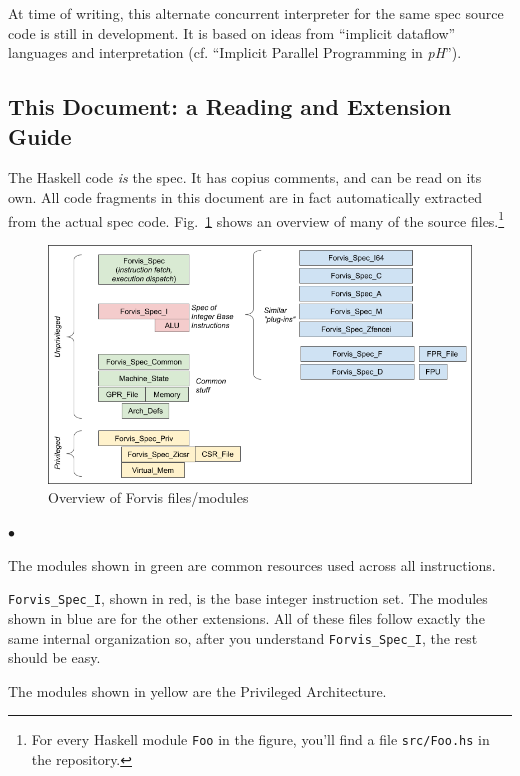 \documentclass[11pt]{article}
\newenvironment{tightlist}%
{\begin{list}{$\bullet$}{%
    \setlength{\topsep}{0in}
    \setlength{\partopsep}{0in}
    \setlength{\itemsep}{0in}
    \setlength{\parsep}{0in}
    \setlength{\leftmargin}{1.5em}
    \setlength{\rightmargin}{0in}
    \setlength{\itemindent}{0in}
}
}%
{\end{list}
}
\begin{document}
At time of writing, this alternate concurrent interpreter for the same
spec source code is still in development.  It is based on ideas from
``implicit dataflow'' languages and interpretation (cf.  ``Implicit
Parallel Programming in \emph{pH}''\cite{Nikhil2000a}).


\subsection{This Document: a Reading and Extension Guide}

The Haskell code \emph{is} the spec.  It has copius comments, and can
be read on its own.  All code fragments in this document are in fact
automatically extracted from the actual spec code.
Fig.~\ref{Fig_Overview} shows an overview of many of the source
files.\footnote{For every Haskell module {\tt Foo} in the figure,
you'll find a file {\tt src/Foo.hs} in the repository.}

\begin{figure}[htbp]
    \centering
    \includegraphics[width=6in]{Figs/Fig_Overview}
    \caption{\label{Fig_Overview}
                    Overview of Forvis files/modules}
\end{figure}

\begin{tightlist}

\item The modules shown in green are common resources used across all instructions.

\item \verb|Forvis_Spec_I|, shown in red, is the base integer
instruction set.  The modules shown in blue are for the other
extensions. All of these files follow exactly the same internal
organization so, after you understand \verb|Forvis_Spec_I|, the rest
should be easy.

\item The modules shown in yellow are the Privileged Architecture.

\end{tightlist}
\end{document}

